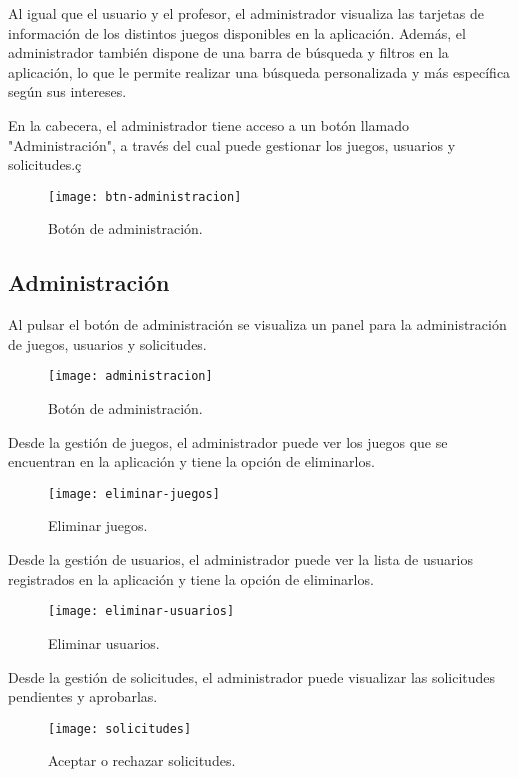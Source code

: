 Al igual que el usuario y el profesor, el administrador visualiza las tarjetas de información de los distintos juegos disponibles en la aplicación. Además, el administrador también dispone de una barra de búsqueda y filtros en la aplicación, lo que le permite realizar una búsqueda personalizada y más específica según sus intereses.

En la cabecera, el administrador tiene acceso a un botón llamado "Administración", a través del cual puede gestionar los juegos, usuarios y solicitudes.ç

\begin{figure}[htb]
\centering
\texttt{[image: btn-administracion]}
\caption{Botón de administración.}
\label{fig:btn-administracion}
\end{figure}

\subsection{Administración}
Al pulsar el botón de administración se visualiza un panel para la administración de juegos, usuarios y solicitudes.
\begin{figure}[htb]
\centering
\texttt{[image: administracion]}
\caption{Botón de administración.}
\label{fig:administracion}
\end{figure}

Desde la gestión de juegos, el administrador puede ver los juegos que se encuentran en la aplicación y tiene la opción de eliminarlos.
\begin{figure}[htb]
\centering
\texttt{[image: eliminar-juegos]}
\caption{Eliminar juegos.}
\label{fig:eliminar-juegos}
\end{figure}
\newpage
Desde la gestión de usuarios, el administrador puede ver la lista de usuarios registrados en la aplicación y tiene la opción de eliminarlos.

\begin{figure}[htb]
\centering
\texttt{[image: eliminar-usuarios]}
\caption{Eliminar usuarios.}
\label{fig:eliminar-usuarios}
\end{figure}

Desde la gestión de solicitudes, el administrador puede visualizar las solicitudes pendientes y aprobarlas.
\begin{figure}[htb]
\centering
\texttt{[image: solicitudes]}
\caption{Aceptar o rechazar solicitudes.}
\label{fig:solicitudes}
\end{figure}